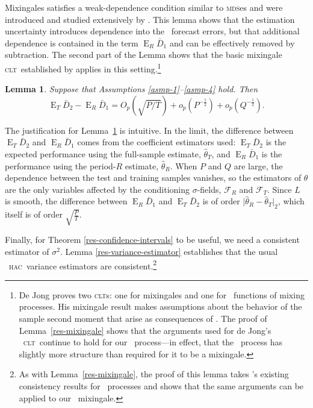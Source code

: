 \documentclass[11pt]{article}
\newtheorem{lem}[thm]{Lemma}
\DeclareMathOperator{\E}{E}
\newcommand{\citepos}[1]{\citeauthor{#1}'s \citeyearpar{#1}}
\newcommand{\mds}{\textsc{mds}}
\newcommand{\clt}{\textsc{clt}}
\newcommand{\hac}{\textsc{hac}}
\begin{document}
Mixingales satisfies a weak-dependence condition similar to \mds es
and were introduced and studied extensively by
\citet{Mcl:74,Mcl:75,Mcl:75b,Mcl:77}.  This lemma shows that the
estimation uncertainty introduces dependence into the \oos\ forecast
errors, but that additional dependence is contained in the term $\E_R
\bar D_1$ and can be effectively removed by subtraction.  The second
part of the Lemma shows that the basic mixingale \clt\ established by
\citet{Dej:97} applies in this setting.\footnote{De Jong proves two
  \clt s: one for mixingales and one for \ned\ functions of mixing
  processes.  His mixingale result makes assumptions about the
  behavior of the sample second moment that arise as consequences of
  \ned.  The proof of Lemma~\ref{res-mixingale} shows that the
  arguments used for de Jong's \ned\ \clt\ continue to hold for our
  \oos\ process---in effect, that the \oos\ process has slightly more
  structure than required for it to be a mixingale.}

\begin{lem} \label{res-convergence} Suppose that Assumptions
  \ref{asmp-1}--\ref{asmp-4} hold.  Then
\begin{equation*}
  \E_T \bar{D}_2 - \E_R \bar D_1 =  O_p(\sqrt{P/T}) +
  o_p(P^{-\frac12}) + o_p(Q^{-\frac12}).
\end{equation*}
\end{lem}

The justification for Lemma~\ref{res-convergence} is intuitive.  In
the limit, the difference between $\E_T \bar{D}_2$ and $\E_R \bar D_1$
comes from the coefficient estimators used: $\E_T\bar{D}_2$ is the
expected performance using the full-sample estimate, $\hat{\theta}_T$,
and $\E_R \bar D_1$ is the performance using the period-$R$ estimate,
$\hat{\theta}_R$.  When $P$ and $Q$ are large, the dependence between
the test and training samples vanishes, so the estimators of $\theta$
are the only variables affected by the conditioning $\sigma$-fields,
$\mathcal{F}_R$ and $\mathcal{F}_T$.  Since $L$ is smooth, the
difference between $\E_R \bar D_1$ and $\E_T \bar D_2$ is of order
$\lvert \hat\theta_R - \hat\theta_T \rvert_2$, which itself is of
order $\sqrt{\frac{P}{T}}$.

Finally, for Theorem \ref{res-confidence-intervals} to be useful, we
need a consistent estimator of $\sigma^2$. Lemma
\ref{res-variance-estimator} establishes that the usual \oos\ \hac\
variance estimators are consistent.\footnote{As with
      Lemma~\ref{res-mixingale}, the proof of this lemma takes
      \citepos{DeD:00} existing consistency results
      for \ned\ processes and shows that the same arguments can be
      applied to our \oos\ mixingale.}
\end{document}
